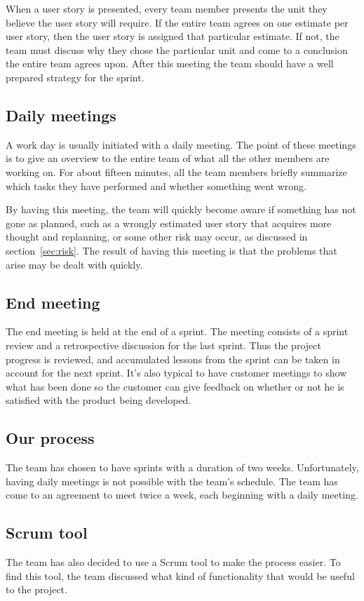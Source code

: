 When a user story is presented, every team member presents the unit they believe the user story will require. If the entire team agrees on one estimate per user story, then the user story is assigned that particular estimate. If not, the team must discuss why they chose the particular unit and come to a conclusion the entire team agrees upon.
After this meeting the team should have a well prepared strategy for the sprint.

\subsection{Daily meetings}
A work day is usually initiated with a daily meeting. The point of these meetings is to give an overview to the entire team of what all the other members are working on. For about fifteen minutes, all the team members briefly summarize which tasks they have performed and whether something went wrong.

By having this meeting, the team will quickly become aware if something has not gone as planned, such as a wrongly estimated user story that acquires more thought and replanning, or some other risk may occur, as discussed in section~\ref{sec:risk}. The result of having this meeting is that the problems that arise may be dealt with quickly.

\subsection{End meeting}
The end meeting is held at the end of a sprint. The meeting consists of a sprint review and a retrospective discussion for the last sprint.
Thus the project progress is reviewed, and accumulated lessons from the sprint can be taken in account for the next sprint.
It's also typical to have customer meetings to show what has been done so the customer can give feedback on 
whether or not he is satisfied with the product being developed.

\subsection{Our process}
The team has chosen to have sprints with a duration of two weeks. Unfortunately, having daily meetings is not possible with the team's schedule. The team has come to an agreement to meet twice a week, each beginning with a daily meeting.

\subsection{Scrum tool}
The team has also decided to use a Scrum tool to make the process easier.
To find this tool, the team discussed what kind of functionality that would be useful to the project.

